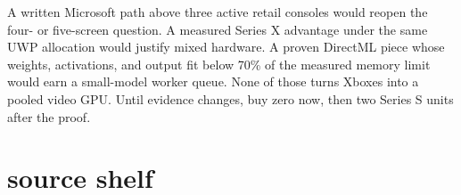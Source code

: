 \documentclass[10pt,letterpaper]{article}
\begin{document}
\begin{bestguess}
A written Microsoft path above three active retail consoles would reopen the
four- or five-screen question. A measured Series X advantage under the same UWP
allocation would justify mixed hardware. A proven DirectML piece whose weights,
activations, and output fit below 70\% of the measured memory limit would earn a
small-model worker queue. None of those turns Xboxes into a pooled video GPU.
Until evidence changes, buy zero now, then two Series S units after the proof.
\end{bestguess}

\newpage
\section{source shelf}
\end{document}
